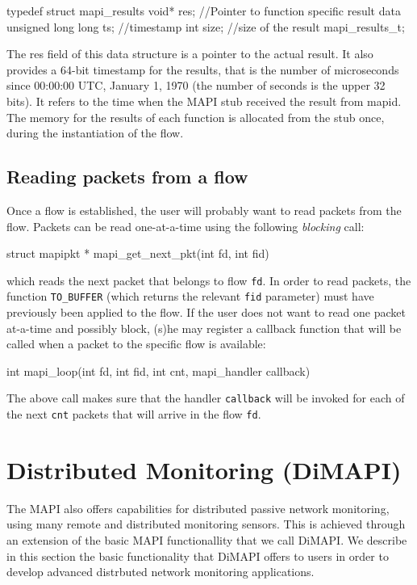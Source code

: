 \documentclass[a4paper, 11pt]{article}
\newenvironment{code}{\small\verbatim}{\endverbatim}
\begin{document}
\begin{code}
typedef struct mapi_results {
  void* res;			//Pointer to function specific result data
  unsigned long long ts;	//timestamp
  int size;			//size of the result
} mapi_results_t;
\end{code}

The res field of this data structure is a pointer to the actual result.
It also provides a 64-bit timestamp for the results, that is the number of microseconds 
since 00:00:00 UTC, January 1, 1970 (the number of seconds is the upper 32 bits).   
It refers to the time when the MAPI stub received the result from mapid.
The memory for the results of each function is allocated from the stub once, 
during the  instantiation  of the flow.

\subsection{Reading packets from a flow}
\label{reading-packets}

Once a flow is established, the user will probably want to read
packets from the flow. Packets can be read one-at-a-time
using the following {\em blocking} call:

\begin{code}
struct mapipkt * mapi_get_next_pkt(int fd, int fid)
\end{code}

which reads the next packet that belongs to flow {\tt fd}.
In order to read packets, the function {\tt TO\_BUFFER}
(which returns the relevant {\tt fid} parameter)
must have previously been applied to the flow.
If the user does not want to read one packet at-a-time
and possibly block, (s)he may register
a callback function that will be called when a packet
to the specific flow is available:

\begin{code}  
int mapi_loop(int fd, int fid, int cnt, mapi_handler callback)
\end{code}  

The above call makes sure that  the handler {\tt callback} 
will be invoked for each of the next {\tt cnt} packets 
that will arrive in the flow {\tt fd}.


\section{Distributed Monitoring (DiMAPI)}
\label{sec:dimapi}

The MAPI also offers capabilities for distributed passive network monitoring, using
many remote and distributed monitoring sensors. This is achieved through an extension
of the basic MAPI functionallity that we call DiMAPI. We describe in this section the
basic functionality that DiMAPI offers to users in order to develop advanced distrbuted 
network monitoring applications.
\end{document}
